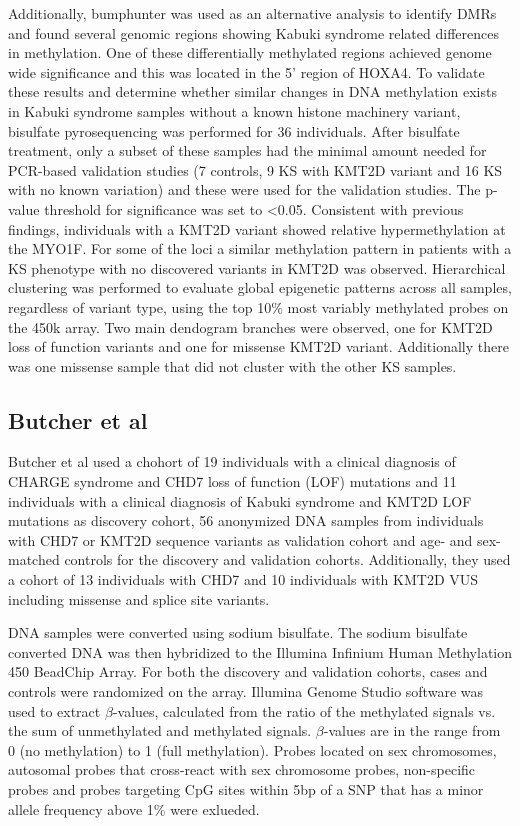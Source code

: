 Additionally, bumphunter was used as an alternative analysis to identify DMRs and found several genomic regions showing Kabuki syndrome related differences in methylation. One of these differentially methylated regions achieved genome wide significance and this was located in the 5' region of HOXA4. To validate these results and determine whether similar changes in DNA methylation exists in Kabuki syndrome samples without a known histone machinery variant, bisulfate pyrosequencing was performed for 36 individuals. After bisulfate treatment, only a subset of these samples had the minimal amount needed for PCR-based validation studies (7 controls, 9 KS with KMT2D variant and 16 KS with no known variation) and these were used for the validation studies. The p-value threshold for significance was set to <0.05. Consistent with previous findings, individuals with a KMT2D variant showed relative hypermethylation at the MYO1F. For some of the loci a similar methylation pattern in patients with a KS phenotype with no discovered variants in KMT2D was observed. Hierarchical clustering was performed to evaluate global epigenetic patterns across all samples, regardless of variant type, using the top 10\% most variably methylated probes on the 450k array. Two main dendogram branches were observed, one for KMT2D loss of function variants and one for missense KMT2D variant. Additionally there was one missense sample that did not cluster with the other KS samples.


\subsection{Butcher et al}
Butcher et al \cite{butcher2017charge} used a chohort of 19 individuals with a clinical diagnosis of CHARGE syndrome and CHD7 loss of function (LOF) mutations and 11 individuals with a clinical diagnosis of Kabuki syndrome and KMT2D LOF mutations as discovery cohort, 56 anonymized DNA samples from individuals with CHD7 or KMT2D sequence variants as validation cohort and age- and sex- matched controls for the discovery and validation cohorts. Additionally, they used a cohort of 13 individuals with CHD7 and 10 individuals with KMT2D VUS including missense and splice site variants.

DNA samples were converted using sodium bisulfate. The sodium bisulfate converted DNA was then hybridized to the Illumina Infinium Human Methylation 450 BeadChip Array. For both the discovery and validation cohorts, cases and controls were randomized on the array. Illumina Genome Studio software was used to extract $\beta$-values, calculated from the ratio of the methylated signals vs. the sum of unmethylated and methylated signals. $\beta$-values are in the range from 0 (no methylation) to 1 (full methylation). Probes located on sex chromosomes, autosomal probes that cross-react with sex chromosome probes, non-specific probes and probes targeting CpG sites within 5bp of a SNP that has a minor allele frequency above 1\% were exlueded. 

